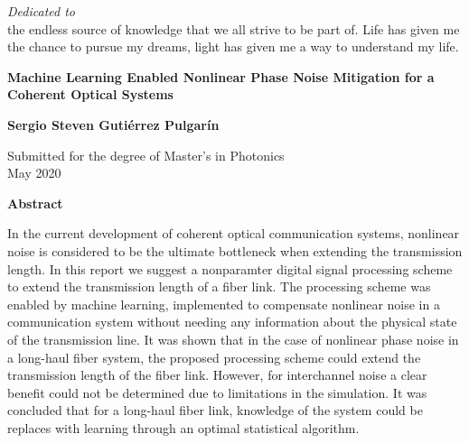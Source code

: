 \newpage
{}

\thispagestyle{empty}
\begin{center}
 \vspace*{2cm}
  \textit{\LARGE {Dedicated to}}\\ 
the endless source of knowledge that we all strive to be part of. Life has given me the chance to pursue my dreams, light has given me a way to understand my life. 



\end{center}


\newpage
\thispagestyle{empty}
\begin{center}
  \textbf{\large Machine Learning Enabled Nonlinear Phase Noise Mitigation for a Coherent Optical Systems}

  \vspace*{1cm}
  \textbf{\normalsize Sergio Steven Guti\'errez Pulgar\'in}

  \vspace*{0.5cm}
  {\normalsize Submitted for the degree of Master's in Photonics\\ May 2020}

  \vspace*{1cm}
  \textbf{\large Abstract}
\end{center}

\noindent In the current development of coherent optical communication systems, nonlinear noise is considered to be the ultimate bottleneck when extending the transmission length. In this report we suggest a nonparamter digital signal processing scheme to extend the transmission length of a fiber link. The processing scheme was enabled by machine learning,  implemented to compensate nonlinear noise in a communication system without needing any information about the physical state of the transmission line. It was shown that in the case of nonlinear phase noise in a long-haul fiber system, the proposed processing scheme could extend the transmission length of the fiber link. However, for interchannel noise a clear benefit could not be determined due to limitations in the simulation. It was concluded that for a long-haul fiber link, knowledge of the system could be replaces with learning through an optimal statistical algorithm. 


